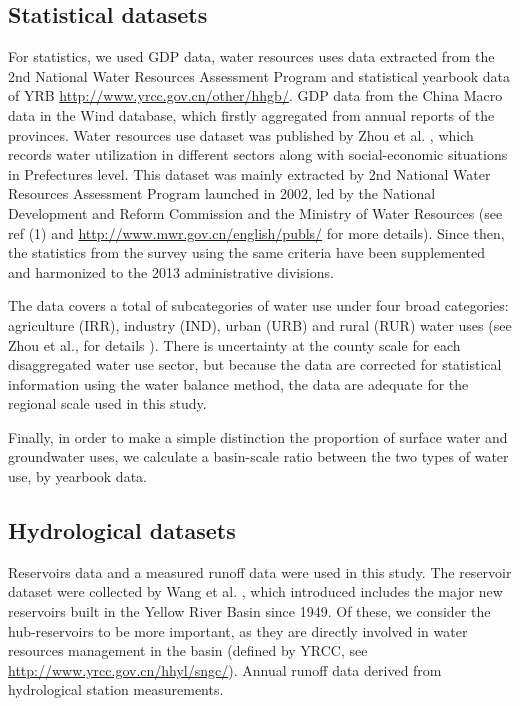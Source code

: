 \documentclass[9pt,twoside,lineno]{pnas-new}
\begin{document}
\subsection*{Statistical datasets}
For statistics, we used GDP data, water resources uses data extracted from the 2nd National Water Resources Assessment Program \cite{zhouDecelerationChinaHuman2020} and statistical yearbook data of YRB \url{http://www.yrcc.gov.cn/other/hhgb/}.
GDP data from the China Macro data in the Wind database, which firstly aggregated from annual reports of the provinces. Water resources use dataset was published by Zhou et al. \cite{zhouDecelerationChinaHuman2020}, which records water utilization in different sectors along with social-economic situations in Prefectures level. This dataset was mainly extracted by 2nd National Water Resources Assessment Program launched in 2002, led by the National Development and Reform Commission and the Ministry of Water Resources (see ref (1) and \url{http://www.mwr.gov.cn/english/publs/} for more details). Since then, the statistics from the survey using the same criteria have been supplemented and harmonized to the 2013 administrative divisions.

The data covers a total of subcategories of water use under four broad categories: agriculture (IRR), industry (IND), urban (URB) and rural (RUR) water uses (see Zhou et al., for details \cite{zhouDecelerationChinahuman2020}). There is uncertainty at the county scale for each disaggregated water use sector, but because the data are corrected for statistical information using the water balance method, the data are adequate for the regional scale used in this study.

Finally, in order to make a simple distinction the proportion of surface water and groundwater uses, we calculate a basin-scale ratio between the two types of water use, by yearbook data.


\subsection*{Hydrological datasets}
Reservoirs data and a measured runoff data were used in this study.
The reservoir dataset were collected by Wang et al. \cite{wangYellowRiverWater2019}, which introduced includes the major new reservoirs built in the Yellow River Basin since 1949.
Of these, we consider the hub-reservoirs to be more important, as they are directly involved in water resources management in the basin (defined by YRCC, see \url{http://www.yrcc.gov.cn/hhyl/sngc/}).
Annual runoff data derived from hydrological station measurements.
\end{document}
